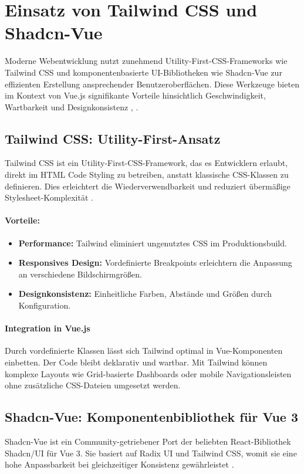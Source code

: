 \section{Einsatz von Tailwind CSS und Shadcn-Vue}

Moderne Webentwicklung nutzt zunehmend Utility-First-CSS-Frameworks wie Tailwind CSS und komponentenbasierte UI-Bibliotheken wie Shadcn-Vue zur effizienten Erstellung ansprechender Benutzeroberflächen. Diese Werkzeuge bieten im Kontext von Vue.js signifikante Vorteile hinsichtlich Geschwindigkeit, Wartbarkeit und Designkonsistenz \cite{TailwindCSS}, \cite{ShadcnVue2023}.

\subsection{Tailwind CSS: Utility-First-Ansatz}
Tailwind CSS ist ein Utility-First-CSS-Framework, das es Entwicklern erlaubt, direkt im HTML Code Styling zu betreiben, anstatt klassische CSS-Klassen zu definieren. Dies erleichtert die Wiederverwendbarkeit und reduziert übermäßige Stylesheet-Komplexität \cite{TailwindCSS}.

\paragraph{Vorteile:}
\begin{itemize}
	\item \textbf{Performance:} Tailwind eliminiert ungenutztes CSS im Produktionsbuild.
	\item \textbf{Responsives Design:} Vordefinierte Breakpoints erleichtern die Anpassung an verschiedene Bildschirmgrößen.
	\item \textbf{Designkonsistenz:} Einheitliche Farben, Abstände und Größen durch Konfiguration.
\end{itemize}

\paragraph{Integration in Vue.js}
Durch vordefinierte Klassen lässt sich Tailwind optimal in Vue-Komponenten einbetten. Der Code bleibt deklarativ und wartbar. Mit Tailwind können komplexe Layouts wie Grid-basierte Dashboards oder mobile Navigationsleisten ohne zusätzliche CSS-Dateien umgesetzt werden.

\subsection{Shadcn-Vue: Komponentenbibliothek f\"ur Vue 3}
Shadcn-Vue ist ein Community-getriebener Port der beliebten React-Bibliothek Shadcn/UI f\"ur Vue 3. Sie basiert auf Radix UI und Tailwind CSS, womit sie eine hohe Anpassbarkeit bei gleichzeitiger Konsistenz gew\"ahrleistet \cite{ShadcnVue2023}.

